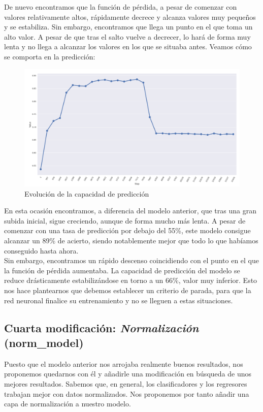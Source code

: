 \documentclass[11pt]{article}
\theoremstyle{plain}
\theoremstyle{definition}
\begin{document}
De nuevo encontramos que la función de pérdida, a pesar de comenzar con 
valores relativamente altos, rápidamente decrece y alcanza valores muy 
pequeños y se estabiliza. Sin embargo, encontramos que llega un punto 
en el que toma un alto valor. A pesar de que tras el salto vuelve a 
decrecer, lo hará de forma muy lenta y no llega a alcanzar los valores
en los que se situaba antes. Veamos cómo se comporta en la predicción:

\begin{figure}[H]
  \centering \includegraphics[width=.95\textwidth]{imgs/accuracy_vlr}
  \caption{Evolución de la capacidad de predicción}
\end{figure}

En esta ocasión encontramos, a diferencia del modelo anterior, que tras
una gran subida inicial, sigue creciendo, aunque de forma mucho más lenta.
A pesar de comenzar con una tasa de predicción por debajo del 55\%, este
modelo consigue alcanzar un 89\% de acierto, siendo notablemente mejor que
todo lo que habíamos conseguido hasta ahora.\\

Sin embargo, encontramos un rápido descenso coincidiendo con el punto en 
el que la función de pérdida aumentaba. La capacidad de predicción del 
modelo se reduce drásticamente estabilizándose en torno a un 66\%, valor 
muy inferior. Esto nos hace plantearnos que debemos establecer un criterio
de parada, para que la red neuronal finalice su entrenamiento y no se 
lleguen a estas situaciones.

\subsection{Cuarta modificación: \textit{Normalización} (norm\_model)}

Puesto que el modelo anterior nos arrojaba realmente buenos resultados,
nos proponemos quedarnos con él y añadirle una modificación en búsqueda
de unos mejores resultados. Sabemos que, en general, los clasificadores
y los regresores trabajan mejor con datos normalizados. Nos proponemos
por tanto añadir una capa de normalización a nuestro modelo.\\
\end{document}

